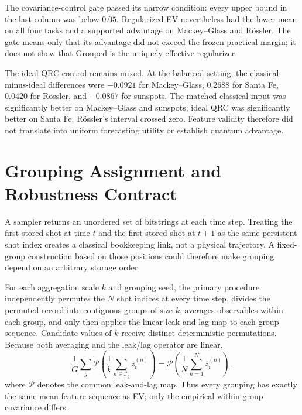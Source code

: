 \documentclass[10pt,conference]{IEEEtran}
\begin{document}
The covariance-control gate passed its narrow condition: every upper bound in
the last column was below $0.05$. Regularized EV nevertheless had the lower
mean on all four tasks and a supported advantage on Mackey--Glass and R\"ossler. The gate means
only that its advantage did not exceed the frozen practical margin; it does not
show that Grouped is the uniquely effective regularizer.

The ideal-QRC control remains mixed. At the balanced setting, the
classical-minus-ideal differences were $-0.0921$ for Mackey--Glass, $0.2688$
for Santa Fe, $0.0420$ for R\"ossler, and $-0.0867$ for sunspots. The matched
classical input was significantly better on Mackey--Glass and sunspots; ideal
QRC was significantly better on Santa Fe; R\"ossler's interval crossed zero.
Feature validity therefore did not translate into uniform forecasting utility
or establish quantum advantage.

\section{Grouping Assignment and Robustness Contract}
\label{app:partitions}

A sampler returns an unordered set of bitstrings at each time step.  Treating
the first stored shot at time $t$ and the first stored shot at $t+1$ as the
same persistent shot index creates a classical bookkeeping link, not a physical
trajectory.  A fixed-group construction based on those positions could
therefore make grouping depend on an arbitrary storage order.

For each aggregation scale $k$ and grouping seed, the primary procedure independently permutes
the $N$ shot indices at every time step, divides the permuted record into
contiguous groups of size $k$, averages observables within each group, and only
then applies the linear leak and lag map to each group sequence.  Candidate
values of $k$ receive distinct deterministic permutations.  Because both
averaging and the leak/lag operator are linear,
\begin{equation}
  \frac{1}{G}\sum_g \mathcal P\!\left(\frac{1}{k}
  \sum_{n\in\mathcal{I}_g}z_t^{(n)}\right)
  =\mathcal P\!\left(\frac{1}{N}\sum_{n=1}^{N}z_t^{(n)}\right),
  \label{eq:supp-mean-preserving}
\end{equation}
where $\mathcal P$ denotes the common leak-and-lag map.  Thus every grouping
has exactly the same mean feature sequence as EV; only the empirical
within-group covariance differs.
\end{document}
